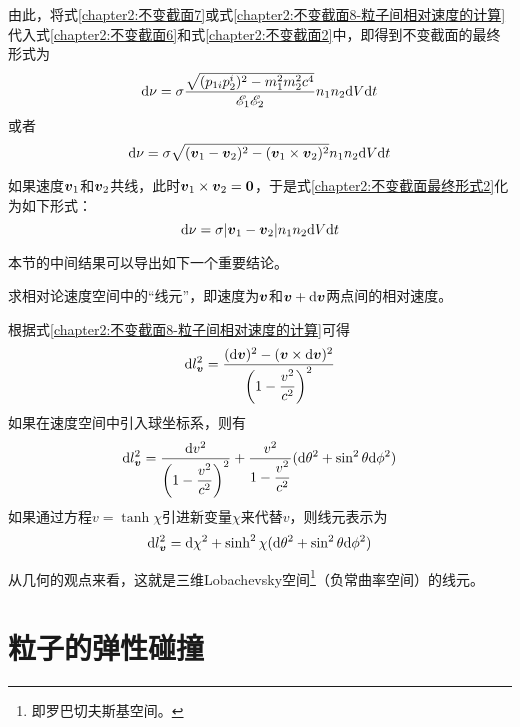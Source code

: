 由此，将式\eqref{chapter2:不变截面7}或式\eqref{chapter2:不变截面8-粒子间相对速度的计算}代入式\eqref{chapter2:不变截面6}和式\eqref{chapter2:不变截面2}中，即得到不变截面的最终形式为
\begin{equation}
	\mathrm{d} \nu = \sigma \frac{\sqrt{(p_{1i}p_2^i)^2-m_1^2m_2^2c^4}}{\mathscr{E}_1\mathscr{E}_2}n_1n_2 \mathrm{d} V\mathrm{d} t
	\label{chapter2:不变截面最终形式1}
\end{equation}
或者
\begin{equation}
	\mathrm{d} \nu = \sigma \sqrt{(\boldsymbol{v}_1-\boldsymbol{v}_2)^2-(\boldsymbol{v}_1 \times \boldsymbol{v}_2)^2} n_1n_2 \mathrm{d} V\mathrm{d} t
	\label{chapter2:不变截面最终形式2}
\end{equation}

如果速度$\boldsymbol{v}_1$和$\boldsymbol{v}_2$共线，此时$\boldsymbol{v}_1\times \boldsymbol{v}_2 = \boldsymbol{0}$，于是式\eqref{chapter2:不变截面最终形式2}化为如下形式：
\begin{equation}
	\mathrm{d} \nu = \sigma |\boldsymbol{v}_1-\boldsymbol{v}_2|n_1n_2 \mathrm{d} V\mathrm{d} t
\end{equation}

本节的中间结果可以导出如下一个重要结论。
\begin{example}
求相对论速度空间中的“线元”，即速度为$\boldsymbol{v}$和$\boldsymbol{v}+\mathrm{d} \boldsymbol{v}$两点间的相对速度。
\end{example}
\begin{solution}
根据式\eqref{chapter2:不变截面8-粒子间相对速度的计算}可得
\begin{equation*}
	\mathrm{d} l_{\boldsymbol{v}}^2 = \frac{(\mathrm{d} \boldsymbol{v})^2 - (\boldsymbol{v}\times \mathrm{d} \boldsymbol{v})^2}{\left(1-\dfrac{v^2}{c^2}\right)^2}
\end{equation*}
如果在速度空间中引入球坐标系，则有
\begin{equation*}
	\mathrm{d} l_{\boldsymbol{v}}^2 = \frac{\mathrm{d} v^2}{\left(1-\dfrac{v^2}{c^2}\right)^2} + \frac{v^2}{1-\dfrac{v^2}{c^2}}(\mathrm{d} \theta^2 + \sin^2 \theta \mathrm{d} \phi^2)
\end{equation*}
如果通过方程$v = \tanh \chi$引进新变量$\chi$来代替$v$，则线元表示为
\begin{equation}
	\mathrm{d} l_{\boldsymbol{v}}^2 = \mathrm{d} \chi^2 + \sinh^2\chi (\mathrm{d} \theta^2 + \sin^2 \theta\mathrm{d} \phi^2)
\end{equation}

从几何的观点来看，这就是三维Lobachevsky空间\footnote{即罗巴切夫斯基空间。}（负常曲率空间）的线元。
\end{solution}

\section{粒子的弹性碰撞}

